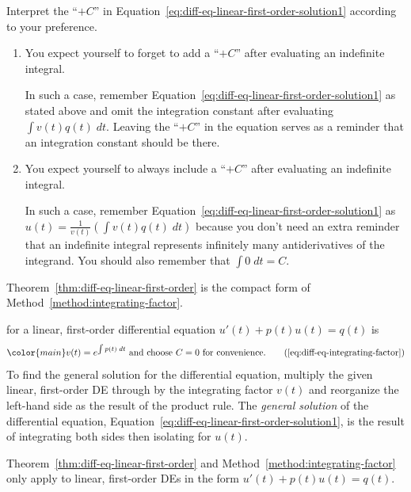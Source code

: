 \documentclass[../main.tex]{subfiles}
\begin{document}
{\footnotesize
Interpret the ``\(+C\)'' in Equation~\eqref{eq:diff-eq-linear-first-order-solution1} according to your preference.

\begin{enumerate}
  \item You expect yourself to forget to add a ``\(+ C\)'' after evaluating an indefinite integral.

    In such a case, remember Equation~\eqref{eq:diff-eq-linear-first-order-solution1} as stated above and omit the integration constant after evaluating \(\int v(t) q(t) \;dt\). Leaving the ``\(+C\)'' in the equation serves as a reminder that an integration constant should be there.

  \item You expect yourself to always include a ``\(+C\)'' after evaluating an indefinite integral.

    In such a case, remember Equation~\eqref{eq:diff-eq-linear-first-order-solution1} as \(u(t) = \frac{1}{v(t)}\left( \int v(t) q(t) \;dt \right)\) because you don't need an extra reminder that an indefinite integral represents infinitely many antiderivatives of the integrand. You should also remember that \(\textstyle \int 0 \;dt = C\).
\end{enumerate}
}


\clearpage

Theorem~\ref{thm:diff-eq-linear-first-order} is the compact form of Method~\ref{method:integrating-factor}.

\begin{method} \label{method:integrating-factor}
   for a linear, first-order differential equation \(u'(t) + p(t) u(t) = q(t)\) is
  \begin{equation} 
    \color{main}
    v(t) = e^{\int p(t) \;dt} \text{ and choose \(C = 0\) for convenience}. \tag{\ref{eq:diff-eq-integrating-factor}}
  \end{equation}
  To find the general solution for the differential equation, multiply the given linear, first-order DE through by the integrating factor \(v(t)\) and reorganize the left-hand side as the result of the product rule. The \emph{general solution} of the differential equation, Equation~\eqref{eq:diff-eq-linear-first-order-solution1}, is the result of integrating both sides then isolating for \(u(t)\).
\end{method}
{\footnotesize \faExclamationTriangle{} Theorem~\ref{thm:diff-eq-linear-first-order} and Method~\ref{method:integrating-factor} only apply to linear, first-order DEs in the form \(u'(t) + p(t) u(t) = q(t)\).}
\end{document}
